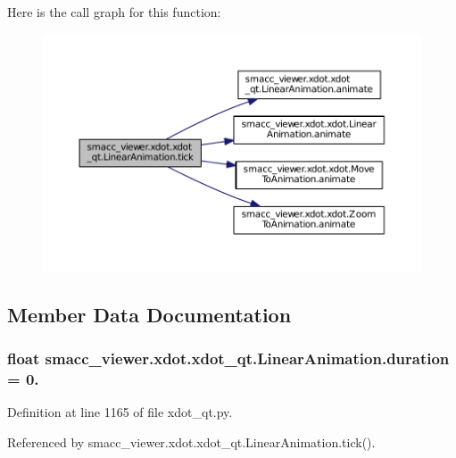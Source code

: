 Here is the call graph for this function\+:
\nopagebreak
\begin{figure}[H]
\begin{center}
\leavevmode
\includegraphics[width=350pt]{classsmacc__viewer_1_1xdot_1_1xdot__qt_1_1LinearAnimation_a224f062fb13cf6aa0026cb8c46f215e3_cgraph}
\end{center}
\end{figure}




\subsection{Member Data Documentation}
\subsubsection[{\texorpdfstring{duration}{duration}}]{\setlength{\rightskip}{0pt plus 5cm}float smacc\+\_\+viewer.\+xdot.\+xdot\+\_\+qt.\+Linear\+Animation.\+duration = 0.\hspace{0.3cm}{\ttfamily [static]}}\hypertarget{classsmacc__viewer_1_1xdot_1_1xdot__qt_1_1LinearAnimation_ade16712fbfe42a3c5f31807dd9bf99e0}{}\label{classsmacc__viewer_1_1xdot_1_1xdot__qt_1_1LinearAnimation_ade16712fbfe42a3c5f31807dd9bf99e0}


Definition at line 1165 of file xdot\+\_\+qt.\+py.



Referenced by smacc\+\_\+viewer.\+xdot.\+xdot\+\_\+qt.\+Linear\+Animation.\+tick().

